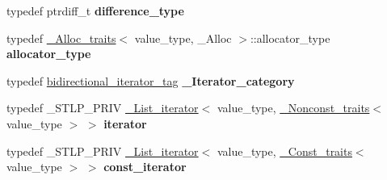 \begin{DoxyCompactItemize}
typedef ptrdiff\+\_\+t {\bfseries difference\+\_\+type}
\item 
\mbox{\label{classlist_a711b13bbac50e075060d9b5174f07c7a}} 
typedef \hyperlink{struct___alloc__traits}{\+\_\+\+Alloc\+\_\+traits}$<$ value\+\_\+type, \+\_\+\+Alloc $>$\+::allocator\+\_\+type {\bfseries allocator\+\_\+type}
\item 
\mbox{\label{classlist_a4d006eb20979430fecb8f805b8ae388f}} 
typedef \hyperlink{structbidirectional__iterator__tag}{bidirectional\+\_\+iterator\+\_\+tag} {\bfseries \+\_\+\+Iterator\+\_\+category}
\item 
\mbox{\label{classlist_aae2ba7c5b23998a165b17ead0fb96550}} 
typedef \+\_\+\+S\+T\+L\+P\+\_\+\+P\+R\+IV \hyperlink{struct___list__iterator}{\+\_\+\+List\+\_\+iterator}$<$ value\+\_\+type, \hyperlink{struct___nonconst__traits}{\+\_\+\+Nonconst\+\_\+traits}$<$ value\+\_\+type $>$ $>$ {\bfseries iterator}
\item 
\mbox{\label{classlist_a59ffd50ace62fb2f5d71ace59c22ae03}} 
typedef \+\_\+\+S\+T\+L\+P\+\_\+\+P\+R\+IV \hyperlink{struct___list__iterator}{\+\_\+\+List\+\_\+iterator}$<$ value\+\_\+type, \hyperlink{struct___const__traits}{\+\_\+\+Const\+\_\+traits}$<$ value\+\_\+type $>$ $>$ {\bfseries const\+\_\+iterator}
\end{DoxyCompactItemize}
